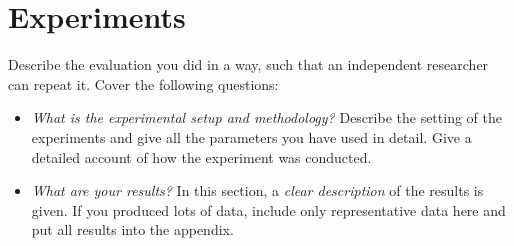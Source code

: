 %
\newpage
\chapter{Experiments}
Describe the evaluation you did in a way, such that an independent researcher can repeat it. Cover the following questions:
\begin{itemize}
 \item \textit{What is the experimental setup and methodology?} Describe the setting of the experiments and give all the parameters you have used in detail. Give a detailed account of how the experiment was conducted.
 \item \textit{What are your results?} In this section, a \emph{clear description} of the results is given. If you produced lots of data, include only representative data here and put all results into the appendix. 
\end{itemize}

